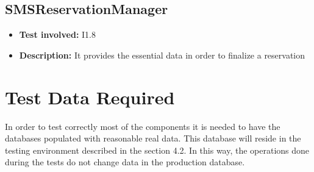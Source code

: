 \subsection{SMSReservationManager}
\begin{itemize}
\item \textbf{Test involved:} I1.8
\item \textbf{Description:} It provides the essential data in order to finalize a reservation
\end{itemize}

\section{Test Data Required}
In order to test correctly most of the components it is needed to have the databases populated with reasonable real data.
This database will reside in the testing environment described in the section 4.2. In this way, the operations done during the tests do not change data in the production database.
